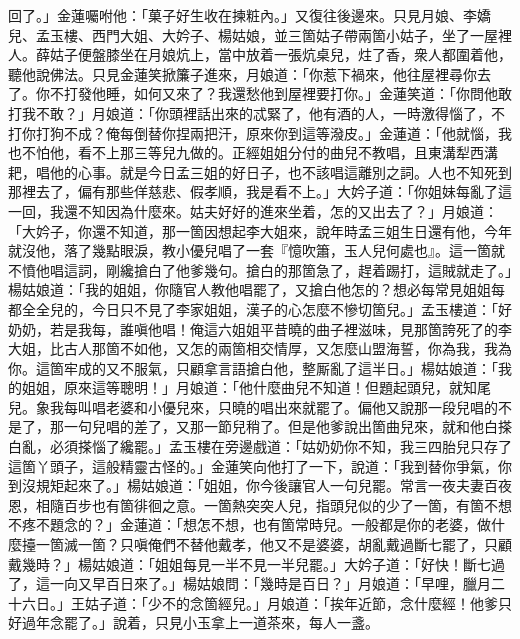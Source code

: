 回了。」金蓮囑咐他：「菓子好生收在揀粧內。」又復往後邊來。只見月娘、李嬌兒、孟玉樓、西門大姐、大妗子、楊姑娘，並三箇姑子帶兩箇小姑子，坐了一屋裡人。薛姑子便盤膝坐在月娘炕上，{}當中放着一張炕桌兒，炷了香，衆人都圍着他，聽他說佛法。只見金蓮笑掀簾子進來，{}月娘道：「你惹下禍來，他往屋裡尋你去了。你不打發他睡，如何又來了？我還愁他到屋裡要打你。」金蓮笑道：「你問他敢打我不敢？」{}月娘道：「你頭裡話出來的忒緊了，他有酒的人，一時激得惱了，不打你打狗不成？俺每倒替你捏兩把汗，原來你到這等潑皮。」金蓮道：「他就惱，我也不怕他，看不上那三等兒九做的。正經姐姐分付的曲兒不教唱，且東溝犁西溝耙，唱他的心事。就是今日孟三姐的好日子，也不該唱這離別之詞。{}人也不知死到那裡去了，偏有那些佯慈悲、假孝順，我是看不上。」大妗子道：「你姐妹每亂了這一回，我還不知因為什麼來。姑夫好好的進來坐着，怎的又出去了？」月娘道：「大妗子，你還不知道，那一箇因想起李大姐來，說年時孟三姐生日還有他，今年就沒他，落了幾點眼淚，教小優兒唱了一套『憶吹簫，玉人兒何處也』。這一箇就不憤他唱這詞，剛纔搶白了他爹幾句。搶白的那箇急了，趕着踢打，這賊就走了。」楊姑娘道：「我的姐姐，你隨官人教他唱罷了，又搶白他怎的？想必每常見姐姐每都全全兒的，今日只不見了李家姐姐，漢子的心怎麼不慘切箇兒。」孟玉樓道：「好奶奶，若是我每，誰嗔他唱！俺這六姐姐平昔曉的曲子裡滋味，見那箇誇死了的李大姐，比古人那箇不如他，又怎的兩箇相交情厚，又怎麼山盟海誓，你為我，我為你。這箇牢成的又不服氣，只顧拿言語搶白他，整厮亂了這半日。」楊姑娘道：「我的姐姐，原來這等聰明！」月娘道：「他什麼曲兒不知道！但題起頭兒，就知尾兒。象我每叫唱老婆和小優兒來，只曉的唱出來就罷了。偏他又說那一段兒唱的不是了，那一句兒唱的差了，又那一節兒稍了。但是他爹說出箇曲兒來，就和他白搽白亂，必須搽惱了纔罷。」孟玉樓在旁邊戲道：「姑奶奶你不知，我三四胎兒只存了這箇丫頭子，這般精靈古怪的。」金蓮笑向他打了一下，說道：「我到替你爭氣，你到沒規矩起來了。」楊姑娘道：「姐姐，你今後讓官人一句兒罷。常言一夜夫妻百夜恩，相隨百步也有箇徘徊之意。一箇熱突突人兒，指頭兒似的少了一箇，{}有箇不想不疼不題念的？」金蓮道：「想怎不想，也有箇常時兒。一般都是你的老婆，做什麼擡一箇滅一箇？只嗔俺們不替他戴孝，他又不是婆婆，胡亂戴過斷七罷了，{}只顧戴幾時？」楊姑娘道：「姐姐每見一半不見一半兒罷。」大妗子道：「好快！斷七過了，這一向又早百日來了。」{}楊姑娘問：「幾時是百日？」月娘道：「早哩，臘月二十六日。」王姑子道：「少不的念箇經兒。」{}月娘道：「挨年近節，念什麼經！他爹只好過年念罷了。」說着，只見小玉拿上一道茶來，每人一盞。

